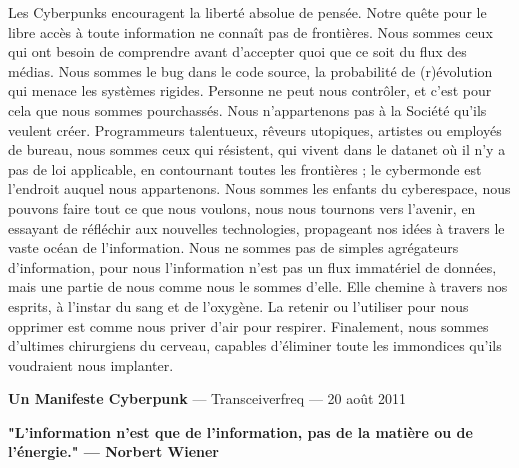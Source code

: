 \documentclass[11pt,twoside,a4paper]{book}
\begin{document}
\begin{enumerate}
		Les Cyberpunks encouragent la libert{\'e} absolue de pens{\'e}e. Notre qu{\^e}te pour le libre acc{\`e}s {\`a} toute information ne conna{\^i}t pas de fronti{\`e}res. Nous sommes ceux qui ont besoin de comprendre avant d'accepter quoi que ce soit du flux des m{\'e}dias. Nous sommes le bug dans le code source, la probabilit{\'e} de (r){\'e}volution qui menace les syst{\`e}mes rigides. Personne ne peut nous contr{\^o}ler, et c'est pour cela que nous sommes pourchass{\'e}s. Nous n'appartenons pas {\`a} la Soci{\'e}t{\'e} qu'ils veulent cr{\'e}er. Programmeurs talentueux, r{\^e}veurs utopiques, artistes ou employ{\'e}s de bureau, nous sommes ceux qui r{\'e}sistent, qui vivent dans le datanet o{\`u} il n'y a pas de loi applicable, en contournant toutes les fronti{\`e}res ; le cybermonde est l'endroit auquel nous appartenons. Nous sommes les enfants du cyberespace, nous pouvons faire tout ce que nous voulons, nous nous tournons vers l'avenir, en essayant de r{\'e}fl{\'e}chir aux nouvelles technologies, propageant nos id{\'e}es {\`a} travers le vaste oc{\'e}an de l'information. Nous ne sommes pas de simples agr{\'e}gateurs d'information, pour nous l'information n'est pas un flux immat{\'e}riel de donn{\'e}es, mais une partie de nous comme nous le sommes d'elle. Elle chemine {\`a} travers nos esprits, {\`a} l'instar du sang et de l'oxyg{\`e}ne. La retenir ou l'utiliser pour nous opprimer est comme nous priver d'air pour respirer. Finalement, nous sommes d'ultimes chirurgiens du cerveau, capables d'{\'e}liminer toute les immondices qu'ils voudraient nous implanter.
\end{enumerate}

\clearpage

\textbf{\large Un Manifeste Cyberpunk} --- Transceiverfreq --- 20 ao{\^u}t 2011 %

	\textbf{\footnotesize "L'information n'est que de l'information, pas de la mati{\`e}re ou de l'{\'e}nergie." --- Norbert Wiener }~\\
\end{document}
